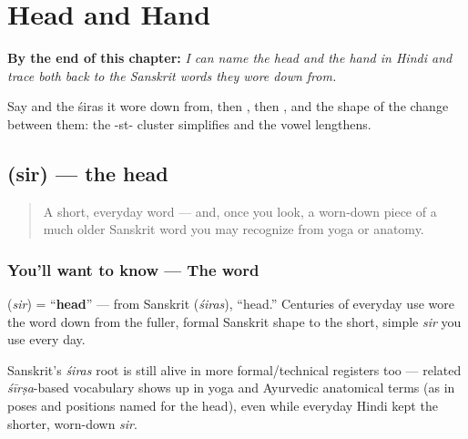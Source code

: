 
\chapter{Head and Hand}
\label{ch:hi-head-and-hand}

\begin{chapteropening}
\textbf{By the end of this chapter:} \emph{I can name the head and the hand in Hindi and trace both back to the Sanskrit words they wore down from.}

Say  and the śiras it wore down from, then , then , and the shape of the change between them: the -st- cluster simplifies and the vowel lengthens.
\end{chapteropening}

\section[\texorpdfstring{\hi{सिर} (sir)}{सिर (sir)}]{ (sir) — the head}

\label{lesson:HI-C13-sir}



\begin{quote}
A short, everyday word — and, once you look, a worn-down piece of a much older Sanskrit word you may recognize from yoga or anatomy.
\end{quote}

\subsection*{You'll want to know — The word}
\textbf{} (\emph{sir}) = \textquotedblleft{}\textbf{head}\textquotedblright{} — from Sanskrit \textbf{} (\emph{śiras}), \textquotedblleft{}head.\textquotedblright{} Centuries of everyday use wore the word down from the fuller, formal Sanskrit shape to the short, simple \emph{sir} you use every day.

Sanskrit's \emph{śiras} root is still alive in more formal/technical registers too — related \emph{śīrṣa}-based vocabulary shows up in yoga and Ayurvedic anatomical terms (as in poses and positions named for the head), even while everyday Hindi kept the shorter, worn-down \emph{sir}.

